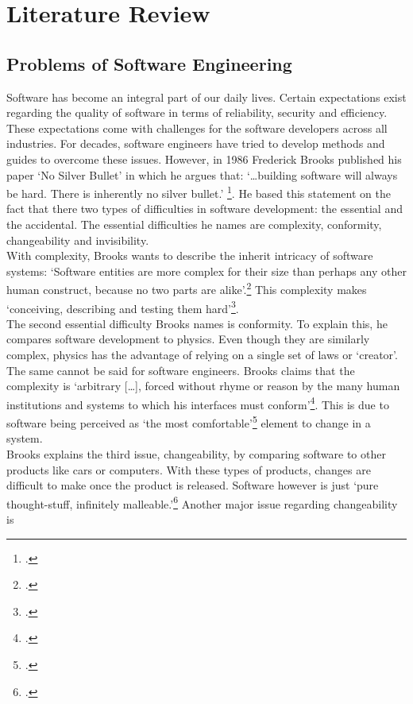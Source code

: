 \section{Literature Review}
\subsection{Problems of Software Engineering}
Software has become an integral part of our daily lives. Certain expectations exist regarding the quality of software in terms of reliability, security and efficiency. These expectations come with challenges for the software developers across all industries.
For decades, software engineers have tried to develop methods and guides to overcome these issues. However, in 1986 Frederick Brooks published his paper `No Silver Bullet'
in which he argues that: `\ldots building software will always be hard. There is inherently no silver bullet.' \footcite[3]{brooksNoSilverBullet1987}. He based this statement on the fact that there two types of difficulties in software development: the essential and the accidental.
The essential difficulties he names are complexity, conformity, changeability and invisibility.\\
With complexity, Brooks wants to describe the inherit intricacy of software systems: `Software entities are more complex for their size than perhaps any other human construct, because no two parts are alike'.\footcite[3]{brooksNoSilverBullet1987}
This complexity makes `conceiving, describing and testing them hard'\footcite[3]{brooksNoSilverBullet1987}.\\
The second essential difficulty Brooks names is conformity. To explain this, he compares software development to physics. Even though they are similarly complex, physics has the advantage of relying on a single set of laws or `creator'. The same cannot be said for software engineers. Brooks claims that
the complexity is `arbitrary [\ldots], forced without rhyme or reason by the many human institutions and systems to which his interfaces must conform'\footcite[4]{brooksNoSilverBullet1987}. This is due to software being perceived as `the most comfortable'\footcite[4]{brooksNoSilverBullet1987} element to change in a system.\\
Brooks explains the third issue, changeability, by comparing software to other products like cars or computers. With these types of products, changes are difficult to make once the product is released. Software however is just `pure thought-stuff, infinitely malleable.'\footcite[4]{brooksNoSilverBullet1987} Another major issue regarding changeability is
